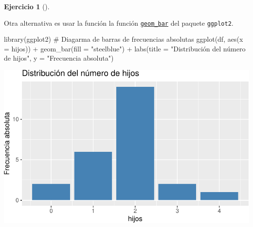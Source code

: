 \documentclass[
  a4paper,
]{scrreport}
\newenvironment{Shaded}{\begin{snugshade}}{\end{snugshade}}
\newcommand{\AttributeTok}[1]{\textcolor[rgb]{0.40,0.45,0.13}{#1}}
\newcommand{\CommentTok}[1]{\textcolor[rgb]{0.37,0.37,0.37}{#1}}
\newcommand{\FunctionTok}[1]{\textcolor[rgb]{0.28,0.35,0.67}{#1}}
\newcommand{\NormalTok}[1]{\textcolor[rgb]{0.00,0.23,0.31}{#1}}
\newcommand{\SpecialCharTok}[1]{\textcolor[rgb]{0.37,0.37,0.37}{#1}}
\newcommand{\StringTok}[1]{\textcolor[rgb]{0.13,0.47,0.30}{#1}}
\theoremstyle{definition}
\newtheorem{exercise}{Ejercicio}[chapter]
\theoremstyle{remark}
\begin{document}
\begin{exercise}[]
\begin{enumerate}
\begin{tcolorbox}
  \end{tcolorbox}

  \begin{tcolorbox}[enhanced jigsaw, toprule=.15mm, rightrule=.15mm, arc=.35mm, colback=white, colbacktitle=quarto-callout-tip-color!10!white, toptitle=1mm, left=2mm, colframe=quarto-callout-tip-color-frame, opacityback=0, breakable, opacitybacktitle=0.6, bottomtitle=1mm, titlerule=0mm, title=\textcolor{quarto-callout-tip-color}{\faLightbulb}\hspace{0.5em}{Solución 2}, bottomrule=.15mm, coltitle=black, leftrule=.75mm]

  Otra alternativa es usar la función la función
  \href{https://aprendeconalf.es/manual-r/07-graficos.html\#diagramas-de-barras}{\texttt{geom\_bar}}
  del paquete \texttt{ggplot2}.

\begin{Shaded}
\begin{Highlighting}[]
\FunctionTok{library}\NormalTok{(ggplot2)}
\CommentTok{\# Diagarma de barras de frecuencias absolutas}
\FunctionTok{ggplot}\NormalTok{(df, }\FunctionTok{aes}\NormalTok{(}\AttributeTok{x =}\NormalTok{ hijos)) }\SpecialCharTok{+}
    \FunctionTok{geom\_bar}\NormalTok{(}\AttributeTok{fill =} \StringTok{"steelblue"}\NormalTok{) }\SpecialCharTok{+} 
    \FunctionTok{labs}\NormalTok{(}\AttributeTok{title =} \StringTok{"Distribución del número de hijos"}\NormalTok{, }\AttributeTok{y =} \StringTok{"Frecuencia absoluta"}\NormalTok{)}
\end{Highlighting}
\end{Shaded}

  \includegraphics{03-frecuencias-graficos_files/figure-pdf/unnamed-chunk-7-1.pdf}


\end{tcolorbox}
\end{enumerate}
\end{exercise}
\end{document}

